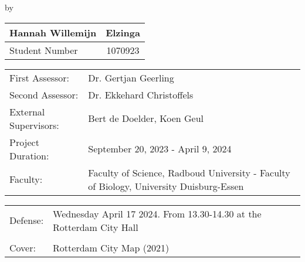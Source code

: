 \begin{titlepage}

\begin{center}

{\makeatletter
\largetitlestyle\fontsize{45}{45}\selectfont\@title
\makeatother}

{\makeatletter
\ifdefvoid{\@subtitle}{}{\bigskip\titlestyle\fontsize{20}{20}\selectfont\@subtitle}
\makeatother}

\bigskip
\bigskip

by

\bigskip
\bigskip

{\makeatletter
\largetitlestyle\fontsize{25}{25}\selectfont\@author
\makeatother}

\bigskip
\bigskip

\setlength\extrarowheight{2pt}
\begin{tabular}{lc}
    Hannah Willemijn &Elzinga \\\midrule
    Student Number & 1070923 \\
\end{tabular}

\vfill

\begin{tabular}{ll}
    First Assessor: & Dr. Gertjan Geerling\\
    Second Assessor: & Dr. Ekkehard Christoffels \\
    External Supervisors: & Bert de Doelder, Koen Geul\\
    Project Duration: & September 20, 2023 - April 9, 2024\\
    Faculty: & Faculty of Science, Radboud University - Faculty of Biology, University Duisburg-Essen \\
\end{tabular}

\bigskip
\bigskip


\begin{tabular}{ll}
    Defense:& Wednesday April 17 2024. From 13.30-14.30 at the Rotterdam City Hall\\
    \\
    Cover:&Rotterdam City Map (2021)
\end{tabular}
\end{center}
\end{titlepage}




